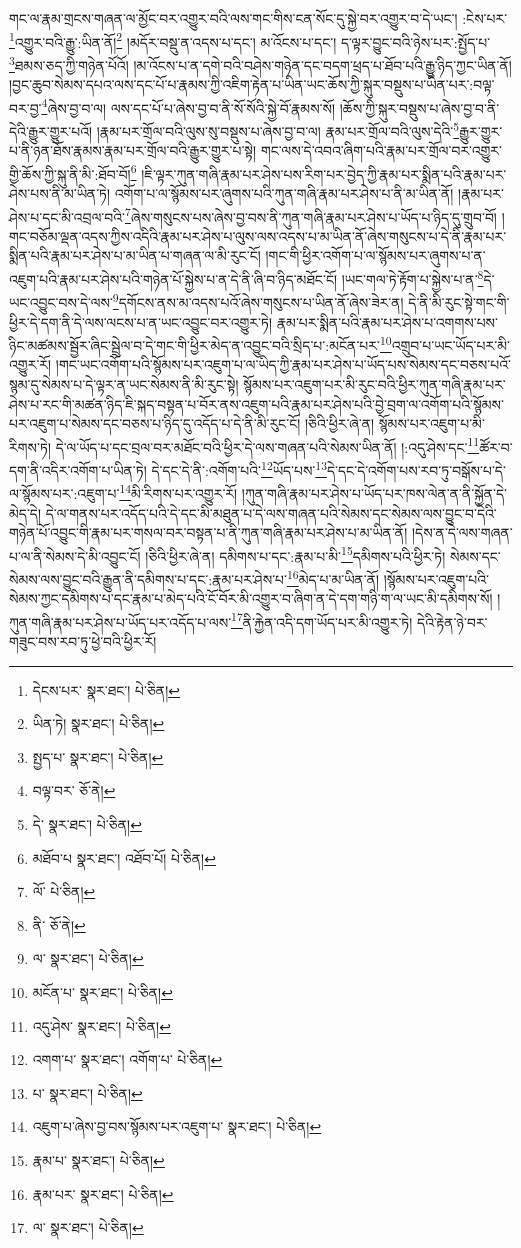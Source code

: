 གང་ལ་རྣམ་གྲངས་གཞན་ལ་མྱོང་བར་འགྱུར་བའི་ལས་གང་གིས་ངན་སོང་དུ་སྐྱེ་བར་འགྱུར་བ་དེ་ཡང་། :ངེས་པར་\footnote{དེངས་པར་  སྣར་ཐང་།  པེ་ཅིན། }འགྱུར་བའི་རྒྱུ་:ཡིན་ནོ།\footnote{ཡིན་ཏེ།  སྣར་ཐང་།  པེ་ཅིན། } །མདོར་བསྡུ་ན་འདས་པ་དང་། མ་འོངས་པ་དང་། ད་ལྟར་བྱུང་བའི་ཉེས་པར་:སྤྱོད་པ་\footnote{སྤྱད་པ་  སྣར་ཐང་།  པེ་ཅིན། }ཐམས་ཅད་ཀྱི་གཉེན་པོའོ། །མ་འོངས་པ་ན་དགེ་བའི་བཤེས་གཉེན་དང་བདག་ཕྲད་པ་ཐོབ་པའི་རྒྱུ་ཉིད་ཀྱང་ཡིན་ནོ། །བྱང་ཆུབ་སེམས་དཔའ་ལས་དང་པོ་པ་རྣམས་ཀྱི་འཇིག་རྟེན་པ་ཡིན་ཡང་ཆོས་ཀྱི་སྐུར་བསྡུས་པ་ཡིན་པར་:བལྟ་བར་བྱ་\footnote{བལྟ་བར་  ཅོ་ནེ། }ཞེས་བྱ་བ་ལ། ལས་དང་པོ་པ་ཞེས་བྱ་བ་ནི་སོ་སོའི་སྐྱེ་བོ་རྣམས་སོ། །ཆོས་ཀྱི་སྐུར་བསྡུས་པ་ཞེས་བྱ་བ་ནི་དེའི་རྒྱུར་གྱུར་པའོ། །རྣམ་པར་གྲོལ་བའི་ལུས་སུ་བསྡུས་པ་ཞེས་བྱ་བ་ལ། རྣམ་པར་གྲོལ་བའི་ལུས་དེའི་\footnote{དེ་  སྣར་ཐང་།  པེ་ཅིན། }རྒྱུར་གྱུར་པ་ནི་ཉན་ཐོས་རྣམས་རྣམ་པར་གྲོལ་བའི་རྒྱུར་གྱུར་པ་སྟེ། གང་ལས་དེ་འབའ་ཞིག་པའི་རྣམ་པར་གྲོལ་བར་འགྱུར་གྱི་ཆོས་ཀྱི་སྐུ་ནི་མི་:ཐོབ་བོ།\footnote{མཐོབ་པ  སྣར་ཐང་། འཐོབ་པོ།  པེ་ཅིན། } །ཇི་ལྟར་ཀུན་གཞི་རྣམ་པར་ཤེས་པས་རིག་པར་བྱེད་ཀྱི་རྣམ་པར་སྨིན་པའི་རྣམ་པར་ཤེས་པས་ནི་མ་ཡིན་ཏེ། འགོག་པ་ལ་སྙོམས་པར་ཞུགས་པའི་ཀུན་གཞི་རྣམ་པར་ཤེས་པ་ནི་མ་ཡིན་ནོ། །རྣམ་པར་ཤེས་པ་དང་མི་འབྲལ་བའི་\footnote{ལོ་  པེ་ཅིན། }ཞེས་གསུངས་པས་ཞེས་བྱ་བས་ནི་ཀུན་གཞི་རྣམ་པར་ཤེས་པ་ཡོད་པ་ཉིད་དུ་གྲུབ་བོ། །གང་བཅོམ་ལྡན་འདས་ཀྱིས་འདིའི་རྣམ་པར་ཤེས་པ་ལུས་ལས་འདས་པ་མ་ཡིན་ནོ་ཞེས་གསུངས་པ་དེ་ནི་རྣམ་པར་སྨིན་པའི་རྣམ་པར་ཤེས་པ་མ་ཡིན་པ་གཞན་ལ་མི་རུང་ངོ། །གང་གི་ཕྱིར་འགོག་པ་ལ་སྙོམས་པར་ཞུགས་པ་ན་འཇུག་པའི་རྣམ་པར་ཤེས་པའི་གཉེན་པོ་སྐྱེས་པ་ན་དེ་ནི་ཞི་བ་ཉིད་མཐོང་ངོ། །ཡང་གལ་ཏེ་རྟོག་པ་སྐྱེས་པ་ན་\footnote{ནི་  ཅོ་ནེ། }དེ་ཡང་འབྱུང་བས་དེ་ལས་\footnote{ལ་  སྣར་ཐང་།  པེ་ཅིན། }དགོངས་ནས་མ་འདས་པའོ་ཞེས་གསུངས་པ་ཡིན་ནོ་ཞེས་ཟེར་ན། དེ་ནི་མི་རུང་སྟེ་གང་གི་ཕྱིར་དེ་དག་ནི་དེ་ལས་ལངས་པ་ན་ཡང་འབྱུང་བར་འགྱུར་ཏེ། རྣམ་པར་སྨིན་པའི་རྣམ་པར་ཤེས་པ་འགགས་པས་ཉིང་མཚམས་སྦྱོར་ཞིང་སྦྲེལ་བ་དེ་གང་གི་ཕྱིར་མེད་ན་འབྱུང་བའི་སྲིད་པ་:མངོན་པར་\footnote{མངོན་པ་  སྣར་ཐང་།  པེ་ཅིན། }འགྲུབ་པ་ཡང་ཡོད་པར་མི་འགྱུར་རོ། །གང་ཡང་འགོག་པའི་སྙོམས་པར་འཇུག་པ་ལ་ཡིད་ཀྱི་རྣམ་པར་ཤེས་པ་ཡོད་པས་སེམས་དང་བཅས་པའོ་སྙམ་དུ་སེམས་པ་དེ་ལྟར་ན་ཡང་སེམས་ནི་མི་རུང་སྟེ། སྙོམས་པར་འཇུག་པར་མི་རུང་བའི་ཕྱིར་ཀུན་གཞི་རྣམ་པར་ཤེས་པ་རང་གི་མཚན་ཉིད་ཇི་སྐད་བསྟན་པ་བོར་ནས་འཇུག་པའི་རྣམ་པར་ཤེས་པའི་བྱེ་བྲག་ལ་འགོག་པའི་སྙོམས་པར་འཇུག་པ་སེམས་དང་བཅས་པ་ཉིད་དུ་འདོད་པ་དེ་ནི་མི་རུང་ངོ། །ཅིའི་ཕྱིར་ཞེ་ན། སྙོམས་པར་འཇུག་པ་མི་རིགས་ཏེ། དེ་ལ་ཡོད་པ་དང་བྲལ་བར་མཐོང་བའི་ཕྱིར་དེ་ལས་གཞན་པའི་སེམས་ཡིན་ནོ། །:འདུ་ཤེས་དང་\footnote{འདུ་ཤེས་  སྣར་ཐང་།  པེ་ཅིན། }ཚོར་བ་དག་ནི་འདིར་འགོག་པ་ཡིན་ཏེ། དེ་དང་དེ་ནི་:འགོག་པའི་\footnote{འགག་པ་  སྣར་ཐང་། འགོག་པ་  པེ་ཅིན། }ཡོད་པས་\footnote{པ་  སྣར་ཐང་།  པེ་ཅིན། }དེ་དང་དེ་འགོག་པས་རབ་ཏུ་བསྒོས་པ་དེ་ལ་སྙོམས་པར་:འཇུག་པ་\footnote{འཇུག་པ་ཞེས་བྱ་བས་སྙོམས་པར་འཇུག་པ་  སྣར་ཐང་།  པེ་ཅིན། }མི་རིགས་པར་འགྱུར་རོ། །ཀུན་གཞི་རྣམ་པར་ཤེས་པ་ཡོད་པར་ཁས་ལེན་ན་ནི་སྐྱོན་དེ་མེད་དེ། དེ་ལ་གནས་པར་འདོད་པའི་དེ་དང་མི་མཐུན་པ་དེ་ལས་གཞན་པའི་སེམས་དང་སེམས་ལས་བྱུང་བ་དེའི་གཉེན་པོ་འབྱུང་གི་རྣམ་པར་གསལ་བར་བསྟན་པ་ནི་ཀུན་གཞི་རྣམ་པར་ཤེས་པ་མ་ཡིན་ནོ། །དེས་ན་དེ་ལས་གཞན་པ་ལ་ནི་སེམས་དེ་མི་འབྱུང་ངོ། །ཅིའི་ཕྱིར་ཞེ་ན། དམིགས་པ་དང་:རྣམ་པ་མི་\footnote{རྣམ་པ་  སྣར་ཐང་།  པེ་ཅིན། }དམིགས་པའི་ཕྱིར་ཏེ། སེམས་དང་སེམས་ལས་བྱུང་བའི་རྒྱུན་ནི་དམིགས་པ་དང་:རྣམ་པར་ཤེས་པ་\footnote{རྣམ་པར་  སྣར་ཐང་།  པེ་ཅིན། }མེད་པ་མ་ཡིན་ནོ། །སྙོམས་པར་འཇུག་པའི་སེམས་ཀྱང་དམིགས་པ་དང་རྣམ་པ་མེད་པའི་ངོ་བོར་མི་འགྱུར་བ་ཞིག་ན་དེ་དག་གཉི་ག་ལ་ཡང་མི་དམིགས་སོ། །ཀུན་གཞི་རྣམ་པར་ཤེས་པ་ཡོད་པར་འདོད་པ་ལས་\footnote{ལ་  སྣར་ཐང་།  པེ་ཅིན། }ནི་རྐྱེན་འདི་དག་ཡོད་པར་མི་འགྱུར་ཏེ། དེའི་རྟེན་ཉེ་བར་གཟུང་བས་རབ་ཏུ་ཕྱེ་བའི་ཕྱིར་རོ། 